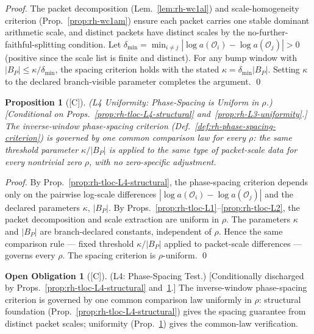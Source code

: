 \documentclass[12pt,oneside]{amsbook}
\theoremstyle{plain}
\newtheorem{proposition}[theorem]{Proposition}
\theoremstyle{definition}
\newtheorem{obligation}[theorem]{Open Obligation}
\theoremstyle{remark}
\newcommand{\status}[1]{\textup{[#1]}}
\begin{document}
\begin{proof}
The packet decomposition (Lem.~\ref{lem:rh-wc1al}) and
scale-homogeneity criterion (Prop.~\ref{prop:rh-wc1am}) ensure
each packet carries one stable dominant arithmetic scale, and
distinct packets have distinct scales by the no-further-faithful-splitting
condition. Let $\delta_{\min} = \min_{i \neq j}
|\log a(\mathcal{O}_i) - \log a(\mathcal{O}_j)| > 0$ (positive
since the scale list is finite and distinct). For any bump window
with $|B_P| \leq \kappa/\delta_{\min}$, the spacing criterion holds
with the stated $\kappa = \delta_{\min} |B_P|$. Setting $\kappa$
to the declared branch-visible parameter completes the argument. \qed
\end{proof}

\begin{proposition}[\status{C}]\label{prop:rh-tloc-L4-uniform}
\textup{(L4 Uniformity: Phase-Spacing is Uniform in $\rho$.)}
\textup{[Conditional on Props.~\ref{prop:rh-tloc-L4-structural}
and~\ref{prop:rh-L3-uniformity}.]}
The inverse-window phase-spacing criterion
(Def.~\ref{def:rh-phase-spacing-criterion}) is governed by one common
comparison law for every $\rho$: the same threshold parameter
$\kappa/|B_P|$ is applied to the same type of packet-scale data for
every nontrivial zero $\rho$, with no zero-specific adjustment.
\end{proposition}

\begin{proof}
By Prop.~\ref{prop:rh-tloc-L4-structural}, the phase-spacing
criterion depends only on the pairwise log-scale differences
$|\log a(\mathcal{O}_i) - \log a(\mathcal{O}_j)|$ and the declared
parameters $\kappa$, $|B_P|$. By
Props.~\ref{prop:rh-tloc-L1}--\ref{prop:rh-tloc-L2}, the packet
decomposition and scale extraction are uniform in $\rho$. The
parameters $\kappa$ and $|B_P|$ are branch-declared constants,
independent of $\rho$. Hence the same comparison rule — fixed
threshold $\kappa/|B_P|$ applied to packet-scale differences — governs
every $\rho$. The spacing criterion is $\rho$-uniform. \qed
\end{proof}

\begin{obligation}[\status{C}]\label{ob:rh-tloc-L4}
\textup{(L4: Phase-Spacing Test.)}
\textup{[Conditionally discharged by
Props.~\ref{prop:rh-tloc-L4-structural}
and~\ref{prop:rh-tloc-L4-uniform}.]}
The inverse-window phase-spacing criterion is governed by one common
comparison law uniformly in $\rho$: structural foundation
(Prop.~\ref{prop:rh-tloc-L4-structural}) gives the spacing guarantee
from distinct packet scales; uniformity
(Prop.~\ref{prop:rh-tloc-L4-uniform}) gives the common-law
verification.
\end{obligation}
\end{document}
